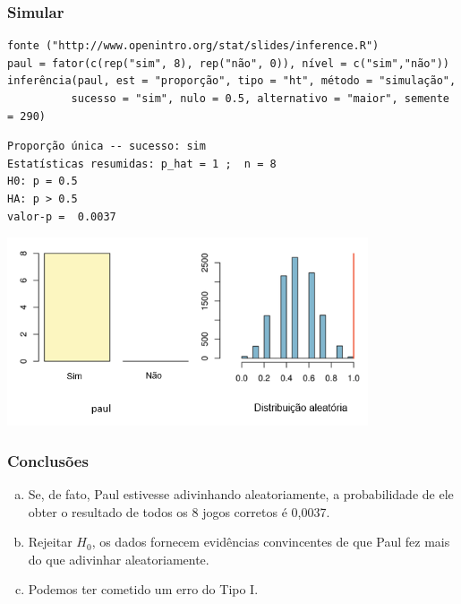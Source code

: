 \begin{frame}[fragile]
\frametitle{Simular}
\justifying
{\tiny
\begin{Verbatim}[frame=single, formatcom=\color{blue}]
fonte ("http://www.openintro.org/stat/slides/inference.R")
paul = fator(c(rep("sim", 8), rep("não", 0)), nível = c("sim","não"))
inferência(paul, est = "proporção", tipo = "ht", método = "simulação",
          sucesso = "sim", nulo = 0.5, alternativo = "maior", semente = 290)
\end{Verbatim}
}

\pause
\justifying
{\tiny
\begin{Verbatim}[frame=single, formatcom=\color{gray}]
Proporção única -- sucesso: sim
Estatísticas resumidas: p_hat = 1 ;  n = 8 
H0: p = 0.5 
HA: p > 0.5 
valor-p =  0.0037
\end{Verbatim}
}

\centering
\includegraphics[width=0.8\textwidth,height=0.4\textheight]{6-5_small_single_prop/paul_HT.png}

\end{frame}


\begin{frame}
\frametitle{Conclusões}
\justifying
{}

\begin{enumerate}[(a)]
\justifying
\item Se, de fato, Paul estivesse adivinhando aleatoriamente, a probabilidade de ele obter o resultado de todos os 8 jogos corretos é 0,0037.
\justifying
\item Rejeitar $H_0$, os dados fornecem evidências convincentes de que Paul fez mais do que adivinhar aleatoriamente.
\justifying
\item Podemos ter cometido um erro do Tipo I.


\end{enumerate}

\end{frame}

